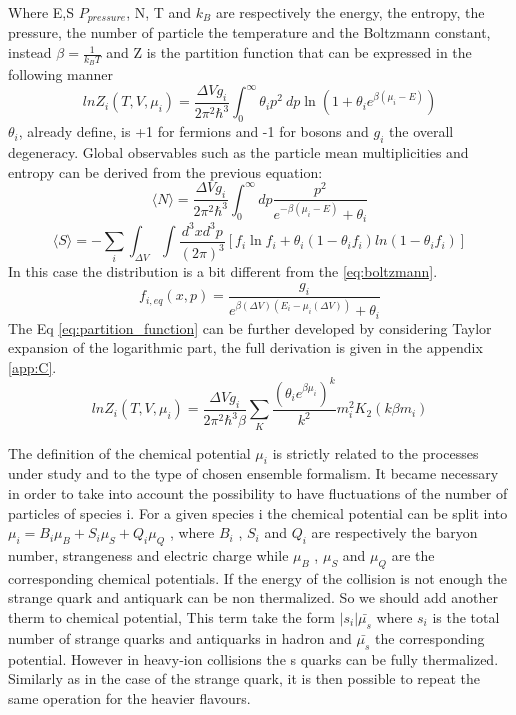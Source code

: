\documentclass[12pt,a4paper]{book}
\begin{document}
	
	Where E,S $P_{pressure}$, N, T and $k_B$ are respectively the energy, the entropy, the pressure, the number of particle the temperature and the Boltzmann constant, instead $\beta=\frac{1}{k_BT}$ and Z is the partition function that can be expressed in the following manner
	\begin{equation}
		ln Z_i(T,V,\mu_i)= \frac{\Delta V g_i}{2\pi^2\hbar^3} \int_{0}^{\infty} \theta_i p^2 \  dp \ln(1+\theta_i e^{\beta(\mu_i-E)})
		\label{eq:partition_function}
	\end{equation}
	$\theta_i$, already define, is +1 for fermions and -1 for bosons and $g_i$ the overall degeneracy. Global observables such as the
	particle mean multiplicities and entropy can be derived from the previous equation:
	\begin{equation}
		\langle N \rangle = \frac{\Delta V g_i}{2\pi^2\hbar^3} \int_{0}^{\infty} dp \frac{p^2}{e^{-\beta(\mu_i-E)}+\theta_i} 
		\label{eq:mean_particle_number}
	\end{equation}
	\begin{equation}
		\langle S \rangle= -\sum_{i} \int_{\Delta V} \int \frac{d^3x d^3p}{(2\pi)^3} \left[f_i \ln f_i + \theta_i (1-\theta_if_i)ln(1-\theta_if_i) \right]
		\label{eq:entropy}
	\end{equation}
	In this case the distribution is a bit different from the \ref{eq:boltzmann}.
	\begin{equation}
		f_{i,eq}(x,p)=\frac{g_i}{e^{\beta(\Delta V)(E_i-\mu_i(\Delta V))} +\theta_i} 
		\label{eq:boltmann2}
	\end{equation}
	The Eq \ref{eq:partition_function} can be further developed by considering  Taylor expansion of the logarithmic part, the full derivation is given in the appendix \ref{app:C}.
	\begin{equation}
		ln Z_i(T,V,\mu_i)= \frac{\Delta V g_i}{2\pi^2\hbar^3\beta} \sum_{K} \frac{(\theta_i e^{\beta \mu_i})^k}{k^2} m_i^2K_2(k\beta m_i)
		\label{eq:partition_function2}
	\end{equation}
	
	The definition of the chemical potential $\mu_i$ is strictly related to the processes under study and to the type of chosen ensemble formalism. It became necessary in order to take into account the possibility to have fluctuations of the number of particles of species i. For a given species i the chemical potential can be split into $\mu_i = B_i \mu_B + S_i \mu_S + Q_i \mu_Q$ , where $B_i$ , $S_i$ and $Q_i$ are respectively the baryon number, strangeness and electric charge while $\mu_B$ , $\mu_S$ and $\mu_Q$ are the corresponding chemical potentials. If the energy of the collision is not enough the strange quark and antiquark can be non thermalized. So we should add another therm to chemical potential, This term take the form $|s_i| \bar{\mu_s}$ where $s_i$ is the total number of strange quarks and antiquarks in hadron and $\bar{\mu_s}$ the corresponding potential. However in heavy-ion collisions the s quarks can be fully thermalized. Similarly as in the case of the strange quark, it is then possible to repeat the same operation for the heavier flavours.
	
\end{document}
